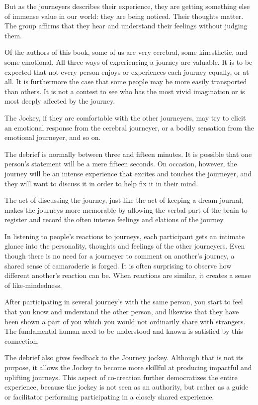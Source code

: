 \documentclass[12pt]{book}
\begin{document}
But as the journeyers describes their experience, they are getting something else of immense value in our world: they are being noticed. Their thoughts matter. The group affirms that they hear and understand their feelings without judging them.
					
Of the authors of this book, some of us are very cerebral, some kinesthetic, and some emotional. All three ways of experiencing a journey are valuable. It is to be expected that not every person enjoys or experiences each journey equally, or at all. It is furthermore the case that some people may be more easily transported than others.
It is not a contest to see who has the most vivid imagination or is most deeply affected by the journey.
					
The Jockey, if they are comfortable with the other journeyers, may try to elicit an emotional response from the cerebral journeyer, or a bodily sensation from the emotional journeyer, and so on.
					
The debrief is normally between three and fifteen minutes. It is possible that one person’s statement will be a mere fifteen seconds. On occasion, however, the journey will be an intense experience that excites and touches the journeyer, and they will want to discuss it in order to help fix it in their mind.

The act of discussing the journey, just like the act of keeping a dream journal, makes the journeys more memorable by allowing the verbal part of the brain to register and record the often intense feelings and elations of the journey.
					
In listening to people’s reactions to journeys, each participant gets an intimate glance into the personality, thoughts and feelings of the other journeyers. Even though there is no need for a journeyer to comment on another’s journey, a shared sense of camaraderie is forged. It is often surprising to observe how different another’s reaction can be. When reactions are similar, it creates a sense of like-mindedness.
					
After participating in several journey’s with the same person, you start to feel that you know and understand the other person, and likewise that they have been shown a part of you which you would not ordinarily share with strangers. The fundamental human need to be understood and known is satisfied by this connection.
					
The debrief also gives feedback to the Journey jockey. Although that is not its purpose, it allows  the Jockey to become more skillful at producing impactful and uplifting journeys. This aspect of co-creation further democratizes the entire experience, because the jockey is not seen as an authority,
but rather as a guide or facilitator  performing participating in a closely shared experience.
				
\end{document}
